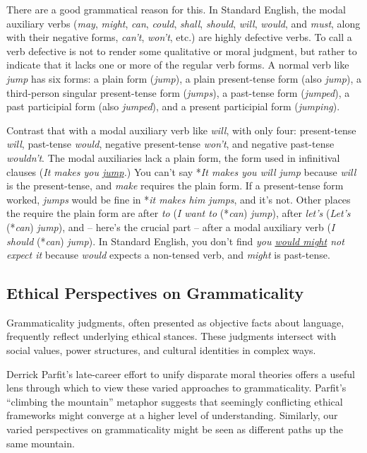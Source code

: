 There are a good grammatical reason for this. In Standard English, the modal auxiliary verbs (\textit{may}, \textit{might}, \textit{can}, \textit{could}, \textit{shall}, \textit{should}, \textit{will}, \textit{would}, and \textit{must}, along with their negative forms, \textit{can't}, \textit{won't}, etc.) are highly defective verbs. To call a verb defective is not to render some qualitative or moral judgment, but rather to indicate that it lacks one or more of the regular verb forms. A normal verb like \textit{jump} has six forms: a plain form (\textit{jump}), a plain present-tense form (also \textit{jump}), a third-person singular present-tense form (\textit{jumps}), a past-tense form (\textit{jumped}), a past participial form (also \textit{jumped}), and a present participial form (\textit{jumping}).

Contrast that with a modal auxiliary verb like \textit{will}, with only four: present-tense \textit{will}, past-tense \textit{would}, negative present-tense \textit{won't}, and negative past-tense \textit{wouldn't}. The modal auxiliaries lack a plain form, the form used in infinitival clauses (\textit{It makes you \uline{jump}.}) You can't say *\textit{It makes you will jump} because \textit{will} is the present-tense, and \textit{make} requires the plain form. If a present-tense form worked, \textit{jumps} would be fine in *\textit{it makes him jumps}, and it's not. Other places the require the plain form are after \textit{to} (\textit{I want to }(*\textit{can})\textit{ jump}), after \textit{let's} (\textit{Let's }(*\textit{can})\textit{ jump}), and -- here's the crucial part -- after a modal auxiliary verb (\textit{I should }(*\textit{can})\textit{ jump}). In Standard English, you don't find \textit{you \uline{would might} not expect it} because \textit{would} expects a non-tensed verb, and \textit{might} is past-tense.

\subsection{Ethical Perspectives on Grammaticality}

Grammaticality judgments, often presented as objective facts about language, frequently reflect underlying ethical stances. These judgments intersect with social values, power structures, and cultural identities in complex ways.

Derrick Parfit's late-career effort to unify disparate moral theories offers a useful lens through which to view these varied approaches to grammaticality. Parfit's ``climbing the mountain'' metaphor suggests that seemingly conflicting ethical frameworks might converge at a higher level of understanding. Similarly, our varied perspectives on grammaticality might be seen as different paths up the same mountain.


